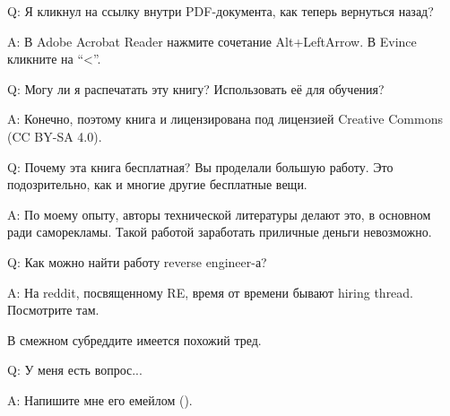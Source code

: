 \par Q: Я кликнул на ссылку внутри PDF-документа, как теперь вернуться назад?
\par A: В Adobe Acrobat Reader нажмите сочетание Alt+LeftArrow. В Evince кликните на ``<''.

\par Q: Могу ли я распечатать эту книгу? Использовать её для обучения?
\par A: Конечно, поэтому книга и лицензирована под лицензией Creative Commons (CC BY-SA 4.0).

\par Q: Почему эта книга бесплатная? Вы проделали большую работу. Это подозрительно, как и многие другие бесплатные вещи.
\par A: По моему опыту, авторы технической литературы делают это, в основном ради саморекламы.
Такой работой заработать приличные деньги невозможно.

\par Q: Как можно найти работу reverse engineer-а?
\par A: На reddit, посвященному RE\FNURLREDDIT, время от времени бывают hiring thread.
Посмотрите там.

В смежном субреддите  имеется похожий тред.

\par Q: У меня есть вопрос...
\par A: Напишите мне его емейлом (\EMAIL).
